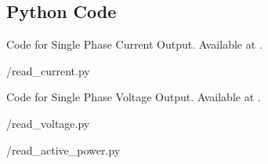 %   

\subsection{Python Code}
\label{sec:modbus-python-code}

\begin{pycode}
  {Code for Single Phase Current Output.
    Available at .}
  \label{py:current-modbus}
  
  {\LocMODpycode/read_current.py}
\end{pycode}

\begin{pycode}
  {Code for Single Phase Voltage Output.
    Available at .}
  \label{py:voltage-modbus}
  
  {\LocMODpycode/read_voltage.py}
\end{pycode}

\begin{pycode}
  \label{py:modbus-power}
  
  {\LocMODpycode/read_active_power.py}
\end{pycode}
